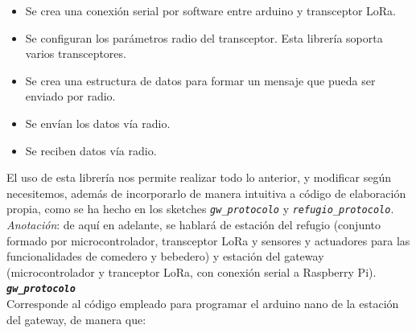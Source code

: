 \documentclass[12pt]{article}
\begin{document}
	\begin{itemize}
		\item Se crea una conexión serial por software entre arduino y transceptor LoRa.
		\item Se configuran los parámetros radio del transceptor. Esta librería soporta varios transceptores.
		\item Se crea una estructura de datos para formar un mensaje que pueda ser enviado por radio.
		\item Se envían los datos vía radio.
		\item Se reciben datos vía radio.
	\end{itemize}
	
	\noindent El uso de esta librería nos permite realizar todo lo anterior, y modificar según necesitemos, además de incorporarlo de manera intuitiva a código de elaboración propia, como se ha hecho en los sketches \texttt{\textit{gw\_protocolo}} y \texttt{\textit{refugio\_protocolo}}. \\
	
	\noindent \textit{Anotación}: de aquí en adelante, se hablará de estación del refugio (conjunto formado por microcontrolador, transceptor LoRa y sensores y actuadores para las funcionalidades de comedero y bebedero) y estación del gateway (microcontrolador y tranceptor LoRa, con conexión serial a Raspberry Pi). \\
	
	\noindent \textbf{\texttt{\textit{gw\_protocolo}}} \\
	
	\noindent Corresponde al código empleado para programar el arduino nano de la estación del gateway, de manera que: \\
	
\end{document}
